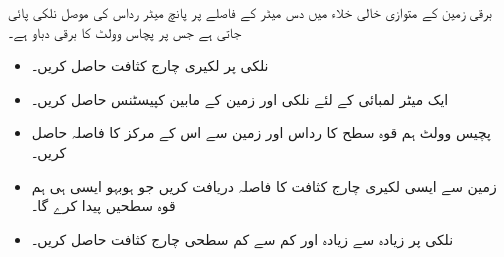 برقی زمین کے متوازی خالی خلاء میں دس میٹر کے فاصلے پر پانچ میٹر رداس کی موصل نلکی پائی جاتی ہے جس پر پچاس وولٹ کا برقی دباو ہے۔
\begin{itemize}
\item
نلکی پر لکیری چارج کثافت حاصل کریں۔
\item
ایک میٹر لمبائی کے لئے نلکی اور زمین کے مابین کپیسٹنس حاصل کریں۔
\item
پچیس وولٹ ہم قوہ سطح کا رداس اور زمین سے اس کے مرکز کا فاصلہ حاصل کریں۔ 
\item
زمین سے ایسی لکیری چارج کثافت کا فاصلہ دریافت کریں جو ہوبہو ایسی ہی ہم قوہ سطحیں پیدا کرے گا۔
\item
نلکی پر زیادہ سے زیادہ  اور کم سے کم سطحی چارج کثافت حاصل کریں۔

\end{itemize}

